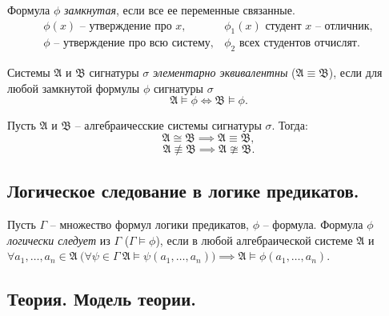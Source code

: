 \begin{definition}
    Формула $ \phi $ \emph{замкнутая}, если все ее переменные связанные.
    \[
        \begin{array}{ll}
            \phi(x) \text{ -- утверждение про }x,        & \phi_1(x) \text{ студент }x \text{ -- отличник}, \\
            \phi \text{ -- утверждение про всю систему}, & \phi_2 \text{ всех студентов отчислят}.
        \end{array}
    \]
\end{definition}

\begin{definition}
    Системы $ \mathfrak{A} $ и $ \mathfrak{B} $ сигнатуры $ \sigma $ \emph{элементарно эквивалентны} ($ \mathfrak{A} \equiv \mathfrak{B} $), если для любой замкнутой формулы $ \phi $ сигнатуры $ \sigma $
    \[
        \mathfrak{A} \vDash \phi \iff \mathfrak{B} \vDash \phi.
    \]
\end{definition}

\begin{theorem}
    Пусть $ \mathfrak{A} $ и $ \mathfrak{B} $ -- алгебраичесские системы сигнатуры $ \sigma $. Тогда:
    \[
        \mathfrak{A} \cong \mathfrak{B} \implies \mathfrak{A} \equiv \mathfrak{B},
    \]
    \[
        \mathfrak{A} \nequiv \mathfrak{B} \implies \mathfrak{A} \ncong \mathfrak{B}.
    \]
\end{theorem}

\subsection{Логическое следование в логике предикатов.}

\begin{definition}
    Пусть $ \Gamma $ -- множество формул логики предикатов, $ \phi $ -- формула. Формула $ \phi $ \emph{логически следует} из $ \Gamma $ ($ \Gamma \vDash \phi $), если в любой алгебраической системе $ \mathfrak{A} $ и $ \forall a_1,\ldots,a_n \in \mathfrak{A} \ \big( \forall \psi \in \Gamma \ \mathfrak{A} \vDash \psi(a_1,\ldots,a_n) \big) \implies \mathfrak{A} \vDash \phi(a_1,\ldots,a_n) $.
\end{definition}

\subsection{Теория. Модель теории.}

